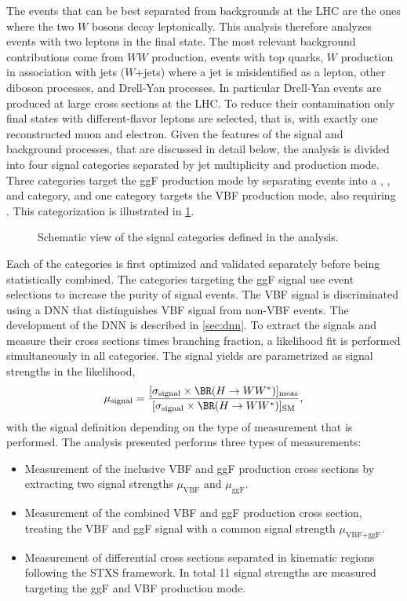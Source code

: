 The \HWW events that can be best separated from backgrounds at the LHC are the ones where the two $W$ bosons decay leptonically.
This analysis therefore analyzes events with two leptons in the final state. 
The most relevant background contributions come from $WW$ production, events with top quarks, $W$ production in association with jets ($W$+jets) where a jet is misidentified as a lepton, other diboson processes, and Drell-Yan processes. In particular Drell-Yan events are produced at large cross sections at the LHC. To reduce their contamination only final states with different-flavor leptons are selected, that is, with exactly one reconstructed muon and electron.
Given the features of the signal and background processes, that are discussed in detail below, the analysis is divided into four signal categories separated by jet multiplicity and production mode.
Three categories target the ggF production mode by separating events into a \ZeroJet, \OneJet, and \TwoJet category, and one category targets the VBF production mode, also requiring \TwoJet. 
This categorization is illustrated in \cref{fig:signal-categorization}. 
\begin{figure}
    \caption{Schematic view of the signal categories defined in the \HWW analysis.}
    \label{fig:signal-categorization}
\end{figure}
Each of the categories is first optimized and validated separately before being statistically combined. 
The categories targeting the ggF signal use event selections to increase the purity of signal events. 
The VBF signal is discriminated using a DNN that distinguishes VBF signal from non-VBF events. 
The development of the DNN is described in \cref{sec:dnn}. 
To extract the signals and measure their cross sections times \HWW branching fraction, a likelihood fit is performed simultaneously in all categories. 
The signal yields are parametrized as signal strengths in the likelihood, 
\begin{equation}
    \label{eq:incl-ggF-VBF-signal-strengths}
    \mu_{\text{signal}} = \frac{ [ \sigma_{\text{signal}}  \times \BR(H \to WW^*) ]_\text{meas} } { [ \sigma_{\text{signal}} \times \BR(H \to WW^*) ]_\text{SM}}, 
\end{equation}
with the signal definition depending on the type of measurement that is performed.
The analysis presented performs three types of measurements:
\begin{itemize}
    \item Measurement of the inclusive VBF and ggF production cross sections by extracting two signal strengths $\mu_{\text{VBF}}$ and $\mu_{\text{ggF}}$.
    \item Measurement of the combined VBF and ggF production cross section, treating the VBF and ggF signal with a common signal strength $\mu_{\text{VBF+ggF}}$. 
    \item Measurement of differential cross sections separated in kinematic regions following the STXS framework. In total 11 signal strengths are measured targeting the ggF and VBF production mode. 
\end{itemize}
